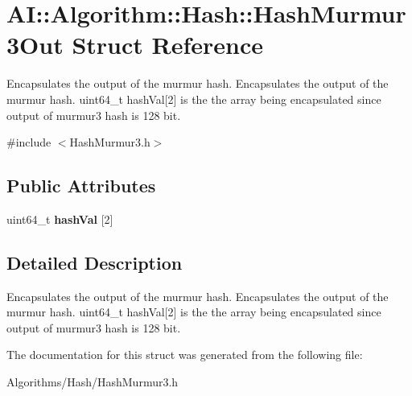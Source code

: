 \hypertarget{structAI_1_1Algorithm_1_1Hash_1_1HashMurmur3Out}{\section{A\+I\+:\+:Algorithm\+:\+:Hash\+:\+:Hash\+Murmur3\+Out Struct Reference}
\label{structAI_1_1Algorithm_1_1Hash_1_1HashMurmur3Out}
}


Encapsulates the output of the murmur hash. Encapsulates the output of the murmur hash. uint64\+\_\+t hash\+Val\mbox{[}2\mbox{]} is the the array being encapsulated since output of murmur3 hash is 128 bit.  




{\ttfamily \#include $<$Hash\+Murmur3.\+h$>$}

\subsection*{Public Attributes}
\begin{DoxyCompactItemize}
\item 
\hypertarget{structAI_1_1Algorithm_1_1Hash_1_1HashMurmur3Out_a181dd4bb7df2d2c722d4bfa8d88f2c0d}{uint64\+\_\+t {\bfseries hash\+Val} \mbox{[}2\mbox{]}}\label{structAI_1_1Algorithm_1_1Hash_1_1HashMurmur3Out_a181dd4bb7df2d2c722d4bfa8d88f2c0d}

\end{DoxyCompactItemize}


\subsection{Detailed Description}
Encapsulates the output of the murmur hash. Encapsulates the output of the murmur hash. uint64\+\_\+t hash\+Val\mbox{[}2\mbox{]} is the the array being encapsulated since output of murmur3 hash is 128 bit. 

The documentation for this struct was generated from the following file\+:\begin{DoxyCompactItemize}
\item 
Algorithms/\+Hash/Hash\+Murmur3.\+h\end{DoxyCompactItemize}
